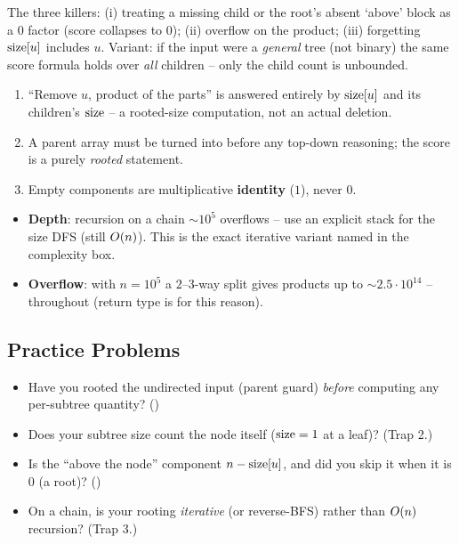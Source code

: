 \begin{warningbox}
The three killers: (i) treating a missing child or the root's absent `above' block as a
$0$ factor (score collapses to $0$); (ii)  overflow on the product; (iii) forgetting
$\operatorname{size}[u]$ includes $u$. Variant: if the input were a \emph{general} tree (not binary) the
same score formula holds over \emph{all} children -- only the child count is unbounded.
\end{warningbox}

\begin{insightbox}
\begin{enumerate}[nosep, leftmargin=1.6em]
  \item ``Remove $u$, product of the parts'' is answered entirely by $\operatorname{size}[u]$ and its
        children's $\operatorname{size}$ -- a rooted-size computation, not an actual deletion.
  \item A parent array must be turned into  before any top-down reasoning;
        the score is a purely \emph{rooted} statement.
  \item Empty components are multiplicative \textbf{identity} ($1$), never $0$.
\end{enumerate}
\end{insightbox}

\begin{hardeningbox}
\begin{itemize}[nosep, leftmargin=1.4em]
  \item \textbf{Depth}: recursion on a chain $\sim10^5$ overflows -- use an explicit stack for
        the size DFS (still $O(n)$). This is the exact iterative variant named in the
        complexity box.
  \item \textbf{Overflow}: with $n=10^5$ a $2$--$3$-way split gives products up to
        $\sim 2.5\cdot10^{14}$ --  throughout (return type is 
        for this reason).
\end{itemize}
\end{hardeningbox}

\subsection{Practice Problems}

\begin{stuckbox}
\begin{itemize}[nosep, leftmargin=1.4em]
  \item Have you rooted the undirected input (parent guard) \emph{before} computing any
        per-subtree quantity? ()
  \item Does your subtree size count the node itself ($\operatorname{size}=1$ at a leaf)? (Trap 2.)
  \item Is the ``above the node'' component $n - \operatorname{size}[u]$, and did you skip it when it is
        $0$ (a root)? ()
  \item On a chain, is your rooting \emph{iterative} (or reverse-BFS) rather than $O(n)$
        recursion? (Trap 3.)
\end{itemize}
\end{stuckbox}

